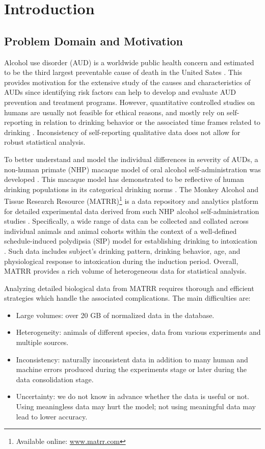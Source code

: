 \chapter{Introduction}

\section{Problem Domain and Motivation}
Alcohol use disorder (AUD) is a worldwide public health concern and estimated to be the third largest preventable cause of death in the United Sates . This provides motivation for the extensive study of the causes and characteristics of AUDs since identifying risk factors can help to develop and evaluate AUD prevention and treatment programs. However, quantitative controlled studies on humans are usually not feasible for ethical reasons, and mostly rely on self-reporting in relation to drinking behavior or the associated time frames related to drinking . Inconsistency of self-reporting qualitative data does not allow for robust statistical analysis. 

To better understand and model the individual differences in severity of AUDs, a non-human primate (NHP) macaque model of oral alcohol self-administration was developed . This macaque model has demonstrated to be reflective of human drinking populations in its categorical drinking norms . The Monkey Alcohol and Tissue Research Resource (MATRR)\footnote{Available online: \url{www.matrr.com}} is a data repository and analytics platform for detailed experimental data derived from such NHP alcohol self-administration studies . Specifically, a wide range of data can be collected and collated across individual animals and animal cohorts within the context of a well-defined schedule-induced polydipsia (SIP) model for establishing drinking to intoxication . Such data includes subject's drinking pattern, drinking behavior, age, and physiological response to intoxication during the induction period. Overall, MATRR provides a rich volume of heterogeneous data for statistical analysis. 

Analyzing detailed biological data from MATRR requires thorough and efficient strategies which handle the associated complications. The main difficulties are: 
\begin{itemize}
	\item Large volumes: over 20 GB of normalized data in the database.
	\item Heterogeneity: animals of different species, data from various experiments and multiple sources.
	\item Inconsistency: naturally inconsistent data in addition to many human and machine errors produced during the experiments stage or later during the data consolidation stage.
	\item Uncertainty: we do not know in advance whether the data is useful or not. Using meaningless data may hurt the model; not using meaningful data may lead to lower accuracy.  
\end{itemize} 

